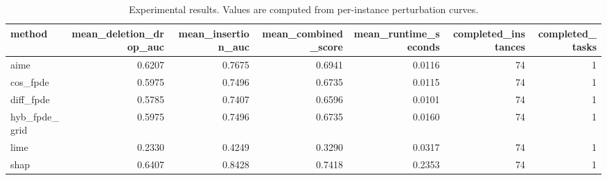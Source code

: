 \begin{table}[t]
\caption{Experimental results. Values are computed from per-instance perturbation curves.}
\label{tab:main_results_computed}
\centering
\begin{tabular}{lrrrrrr}
\toprule
method & mean\_deletion\_drop\_auc & mean\_insertion\_auc & mean\_combined\_score & mean\_runtime\_seconds & completed\_instances & completed\_tasks \\
\midrule
aime & 0.6207 & 0.7675 & 0.6941 & 0.0116 & 74 & 1 \\
cos\_fpde & 0.5975 & 0.7496 & 0.6735 & 0.0115 & 74 & 1 \\
diff\_fpde & 0.5785 & 0.7407 & 0.6596 & 0.0101 & 74 & 1 \\
hyb\_fpde\_grid & 0.5975 & 0.7496 & 0.6735 & 0.0160 & 74 & 1 \\
lime & 0.2330 & 0.4249 & 0.3290 & 0.0317 & 74 & 1 \\
shap & 0.6407 & 0.8428 & 0.7418 & 0.2353 & 74 & 1 \\
\bottomrule
\end{tabular}

\end{table}
